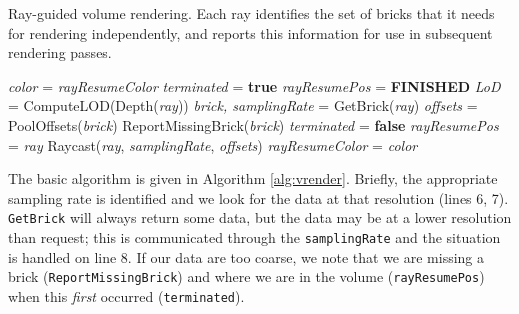 \begin{algorithm}
  \caption{Ray-guided volume rendering.  Each ray identifies the
  set of bricks that it needs for rendering independently, and
  reports this information for use in subsequent rendering passes.}
  \label{alg:vrender}
  \begin{algorithmic}[1]
  \State \textit{color} = \textit{rayResumeColor}
  \State \textit{terminated} = \textbf{true} 
  \State \textit{rayResumePos} = \textbf{FINISHED}
  \Repeat
    \State \textit{LoD} = ComputeLOD(Depth(\textit{ray}))
    \State \textit{brick, samplingRate} = GetBrick(\textit{ray})
    \State \textit{offsets} = PoolOffsets(\textit{brick})
      \State ReportMissingBrick(\textit{brick})
       
        \State \textit{terminated} = \textbf{false}
        \State \textit{rayResumePos} = \textit{ray}
      \EndIf
    \EndIf
    \State Raycast(\textit{ray}, \textit{samplingRate}, \textit{offsets})
  \State \textit{rayResumeColor} = \textit{color}
  \end{algorithmic}
\end{algorithm}

The basic algorithm is given in Algorithm \ref{alg:vrender}.  Briefly, the
appropriate sampling rate is identified and we look for the data at
that resolution (lines 6, 7).
\texttt{GetBrick} will always return some data, but the data may be at
a lower resolution than request; this is
communicated through the \texttt{samplingRate} and the situation is handled
on line 8.  If our data are too coarse, we note that we are missing a
brick (\texttt{ReportMissingBrick}) and where we are in the volume
(\texttt{rayResumePos}) when
this \emph{first} occurred (\texttt{terminated}).



